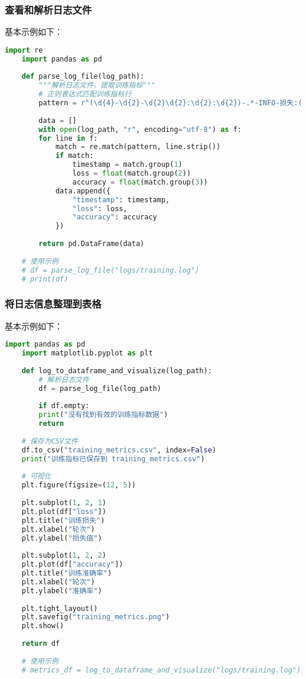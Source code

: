 \subsubsection{查看和解析日志文件}
基本示例如下：
\begin{lstlisting}[language=python,caption={解析日志文件},label=code:View_and_parse_logs]
	import re
	import pandas as pd
	
	def parse_log_file(log_path):
		"""解析日志文件，提取训练指标"""
		# 正则表达式匹配训练指标行
		pattern = r"(\d{4}-\d{2}-\d{2}\d{2}:\d{2}:\d{2})-.*-INFO-损失:([\d.]+),准确率:([\d.]+)"
	
		data = []
		with open(log_path, "r", encoding="utf-8") as f:
		for line in f:
			match = re.match(pattern, line.strip())
			if match:
				timestamp = match.group(1)
				loss = float(match.group(2))
				accuracy = float(match.group(3))
			data.append({
				"timestamp": timestamp,
				"loss": loss,
				"accuracy": accuracy
			})
	
		return pd.DataFrame(data)
	
	# 使用示例
	# df = parse_log_file("logs/training.log")
	# print(df)
\end{lstlisting}




\subsubsection{将日志信息整理到表格}
基本示例如下：
\begin{lstlisting}[language=python,caption={输出至表格},label=code:To_table]
	import pandas as pd
	import matplotlib.pyplot as plt
	
	def log_to_dataframe_and_visualize(log_path):
		# 解析日志文件
		df = parse_log_file(log_path)
	
		if df.empty:
		print("没有找到有效的训练指标数据")
		return
	
	# 保存为CSV文件
	df.to_csv("training_metrics.csv", index=False)
	print("训练指标已保存到 training_metrics.csv")
	
	# 可视化
	plt.figure(figsize=(12, 5))
	
	plt.subplot(1, 2, 1)
	plt.plot(df["loss"])
	plt.title("训练损失")
	plt.xlabel("轮次")
	plt.ylabel("损失值")
	
	plt.subplot(1, 2, 2)
	plt.plot(df["accuracy"])
	plt.title("训练准确率")
	plt.xlabel("轮次")
	plt.ylabel("准确率")
	
	plt.tight_layout()
	plt.savefig("training_metrics.png")
	plt.show()
	
	return df
	
	# 使用示例
	# metrics_df = log_to_dataframe_and_visualize("logs/training.log")
\end{lstlisting}

